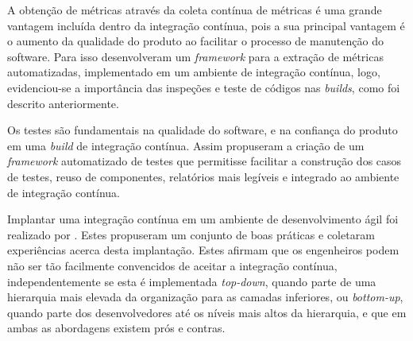A obtenção de métricas através da coleta contínua de métricas é uma grande vantagem incluída dentro da integração contínua, pois a sua principal vantagem é o aumento da qualidade do produto ao facilitar o processo de manutenção do software. Para isso  desenvolveram um \textit{framework} para a extração de métricas automatizadas, implementado em um ambiente de integração contínua, logo, evidenciou-se a importância das inspeções e teste de códigos nas \textit{builds}, como foi descrito anteriormente.

Os testes são fundamentais na qualidade do software, e na confiança do produto em uma \textit{build} de integração contínua. Assim  propuseram a criação de um \textit{framework} automatizado de testes que permitisse facilitar a  construção dos casos de testes, reuso de componentes, relatórios mais legíveis e integrado ao ambiente de integração contínua.

Implantar uma integração contínua em um ambiente de desenvolvimento ágil foi realizado por . Estes propuseram um conjunto de boas práticas e coletaram experiências acerca desta implantação. Estes afirmam que os engenheiros podem não ser tão facilmente convencidos de aceitar a integração contínua, independentemente se esta é implementada \textit{top-down}, quando parte de uma hierarquia mais elevada da organização para as camadas inferiores, ou \textit{bottom-up}, quando parte dos desenvolvedores até os níveis mais altos da hierarquia, e que em ambas as abordagens existem prós e contras.
